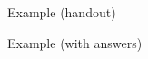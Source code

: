 \begin{frame}{Example (handout)}
  
  \begin{center}
  
  \end{center}
  
\end{frame}

\begin{frame}{Example (with answers)}
  
  \begin{center}
  
  \end{center}
  
\end{frame}


